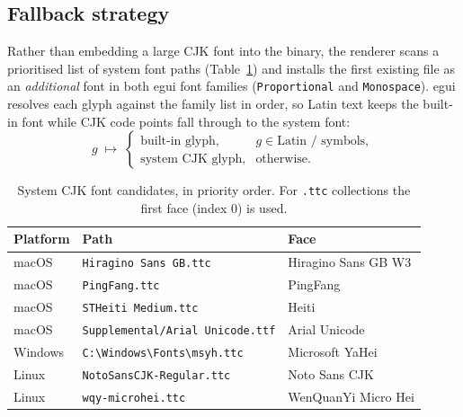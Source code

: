 \documentclass[11pt]{article}
\begin{document}
\subsection{Fallback strategy}

Rather than embedding a large CJK font into the binary, the renderer
scans a prioritised list of system font paths (Table~\ref{tab:cjk})
and installs the first existing file as an \emph{additional} font in
both egui font families (\texttt{Proportional} and
\texttt{Monospace}).  egui resolves each glyph against the family
list in order, so Latin text keeps the built-in font while CJK code
points fall through to the system font:
\begin{equation}
  g \;\longmapsto\;
  \begin{cases}
    \text{built-in glyph},    & g \in \text{Latin / symbols}, \\[2pt]
    \text{system CJK glyph},  & \text{otherwise}.
  \end{cases}
\end{equation}

\begin{table}[h]
\centering
\caption{System CJK font candidates, in priority order.  For
\texttt{.ttc} collections the first face (index 0) is used.}
\label{tab:cjk}
\begin{tabular}{lll}
\toprule
\textbf{Platform} & \textbf{Path} & \textbf{Face} \\ \midrule
macOS   & \texttt{Hiragino Sans GB.ttc}      & Hiragino Sans GB W3 \\
macOS   & \texttt{PingFang.ttc}              & PingFang \\
macOS   & \texttt{STHeiti Medium.ttc}        & Heiti \\
macOS   & \texttt{Supplemental/Arial Unicode.ttf} & Arial Unicode \\
Windows & \texttt{C:\textbackslash Windows\textbackslash Fonts\textbackslash msyh.ttc} & Microsoft YaHei \\
Linux   & \texttt{NotoSansCJK-Regular.ttc}   & Noto Sans CJK \\
Linux   & \texttt{wqy-microhei.ttc}          & WenQuanYi Micro Hei \\
\bottomrule
\end{tabular}
\end{table}
\end{document}
